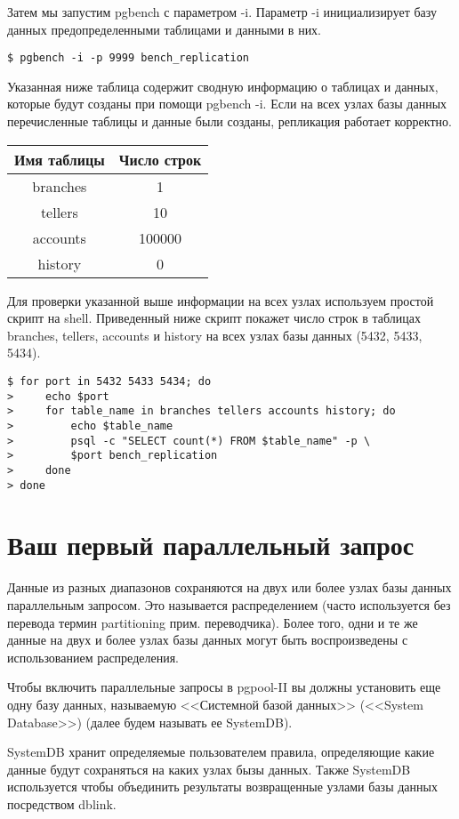 Затем мы запустим pgbench с параметром -i. Параметр -i инициализирует базу данных предопределенными 
таблицами и данными в них.
\begin{verbatim}
$ pgbench -i -p 9999 bench_replication
\end{verbatim}

Указанная ниже таблица содержит сводную информацию о таблицах и данных, которые будут созданы при помощи pgbench -i. 
Если на всех узлах базы данных перечисленные таблицы и данные были созданы, репликация работает корректно.

\begin{tabular}{ | c | c | }
  \hline
  Имя таблицы & Число строк \\
  \hline
  branches & 1 \\
  \hline
  tellers & 10 \\
  \hline
  accounts & 100000 \\
  \hline
  history & 0 \\
  \hline
\end{tabular}

Для проверки указанной выше информации на всех узлах используем простой скрипт на shell. 
Приведенный ниже скрипт покажет число строк в таблицах branches, tellers, accounts и history 
на всех узлах базы данных (5432, 5433, 5434).
\begin{verbatim}
$ for port in 5432 5433 5434; do
>     echo $port
>     for table_name in branches tellers accounts history; do
>         echo $table_name
>         psql -c "SELECT count(*) FROM $table_name" -p \
>         $port bench_replication
>     done
> done
\end{verbatim}


\section{Ваш первый параллельный запрос}
Данные из разных диапазонов сохраняются на двух или более узлах базы данных параллельным запросом. 
Это называется распределением (часто используется без перевода термин partitioning прим. переводчика). 
Более того, одни и те же данные на двух и более узлах базы данных могут быть воспроизведены с использованием распределения.

Чтобы включить параллельные запросы в pgpool-II вы должны установить еще одну базу данных, называемую 
<<Системной базой данных>> (<<System Database>>) (далее будем называть ее SystemDB).

SystemDB хранит определяемые пользователем правила, определяющие какие данные будут сохраняться на каких узлах бызы данных. 
Также SystemDB используется чтобы объединить результаты возвращенные узлами базы данных посредством dblink.

